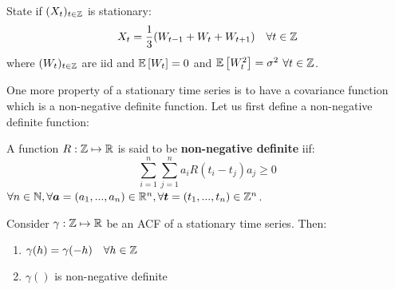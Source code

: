 \begin{exercise}
    State if $(X_t)_{t\in\mathbb{Z}}$ is stationary:
    \[
        X_t=\frac{1}{3}(W_{t-1}+W_t+W_{t+1})\ \ \ \forall t\in\mathbb{Z}  
    \]
    where $(W_t)_{t\in\mathbb{Z}}$ are iid and $\mathbb{E}\left[W_t\right]=0$ and $\mathbb{E}\left[W_t^2\right]=\sigma^2$ $\forall t\in\mathbb{Z}$.
\end{exercise}

One more property of a stationary time series is to have a covariance function which is a non-negative definite function. Let us first define a non-negative definite function:
\begin{definition}
    A function $R:\mathbb{Z}\mapsto\mathbb{R}$ is said to be \textbf{non-negative definite} iif:
    \[
        \sum_{i=1}^{n}\sum_{j=1}^{n}a_iR(t_i-t_j)a_j\ge0  
    \]
    $\forall n\in\mathbb{N},\forall\boldsymbol{a}=(a_1,...,a_n)\in\mathbb{R}^n,\forall\boldsymbol{t}=(t_1,...,t_n)\in\mathbb{Z}^n$.
\end{definition}

\begin{theorem}
    \label{t:acf}
    Consider $\gamma:\mathbb{Z}\mapsto\mathbb{R}$ be an ACF of a stationary time series. Then:
    \begin{enumerate}
        \item $\gamma(h)=\gamma(-h)\ \ \ \forall h\in\mathbb{Z}$
        \item $\gamma()$ is non-negative definite
    \end{enumerate}
\end{theorem}

